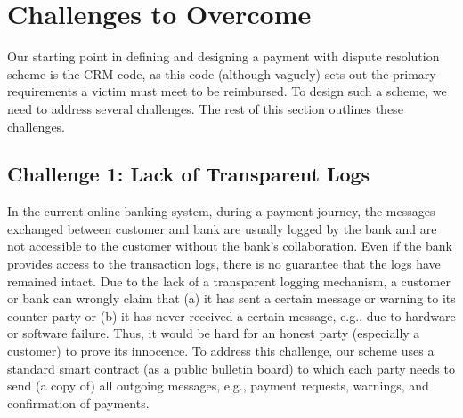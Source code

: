 

\section{Challenges to Overcome}\label{sec:: challenges}


Our starting point in defining and  designing a payment with dispute resolution scheme is the CRM code, as this code (although vaguely) sets out the primary requirements a victim must meet to be reimbursed.  To design such a scheme, we need to address  several challenges. The rest of this section  outlines these challenges. 





\subsection{Challenge 1: Lack of Transparent Logs} 
In the current online  banking system, during a payment journey, the messages exchanged between customer and bank are usually logged by the bank and are not accessible to the customer without the bank's collaboration. Even if the bank provides access to the transaction logs, there is no guarantee that the logs have remained intact. Due to the lack of a transparent logging mechanism, a customer or bank can wrongly claim that (a) it has sent a certain message or warning to its counter-party or (b) it has never  received a certain message, e.g., due to hardware or software failure.  Thus, it would be hard for an honest party (especially a customer) to prove its innocence. To address this challenge, our scheme uses a standard smart contract (as a public bulletin board) to which  each party needs to send (a copy of) all outgoing messages, e.g., payment requests, warnings, and  confirmation of payments. 




